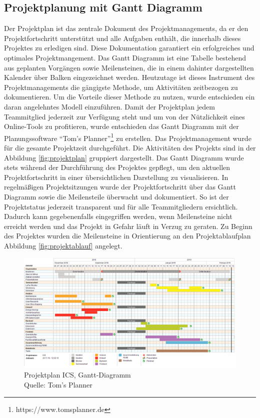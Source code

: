 	\subsection{Projektplanung mit Gantt Diagramm}
	Der Projektplan ist das zentrale Dokument des Projektmanagements, da er den Projektfortschritt unterstützt und alle Aufgaben enthält, die innerhalb dieses Projektes zu erledigen sind. Diese Dokumentation garantiert ein erfolgreiches und optimales Projektmangement. Das Gantt Diagramm ist eine Tabelle bestehend aus geplanten Vorgängen sowie Meilensteinen, die in einem dahinter dargestellten Kalender über Balken eingezeichnet werden\autocite[Vgl.][S. 107]{projektmanagement}. Heutzutage ist dieses Instrument des Projektmanagements die gängigste Methode, um Aktivitäten zeitbezogen zu dokumentieren. Um die Vorteile dieser Methode zu nutzen, wurde entschieden ein daran angelehntes Modell einzuführen. Damit der Projektplan jedem Teammitglied jederzeit zur Verfügung steht und um von der Nützlichkeit eines Online-Tools zu profitieren, wurde entschieden das Gantt Diagramm mit der Planungssoftware \enquote{Tom's Planner}\footnote{https://www.tomsplanner.de} zu erstellen.
	Das Projektmanagement wurde für die gesamte Projektzeit durchgeführt. Die Aktivitäten des Projekts sind in der Abbildung \vref{fig:projektplan} gruppiert dargestellt. Das Gantt Diagramm wurde stets während der Durchführung des Projektes gepflegt, um den aktuellen Projektfortschritt in einer übersichtlichen Darstellung zu visualisieren. In regelmäßigen Projektsitzungen wurde der Projektfortschritt über das Gantt Diagramm sowie die Meilensteile überwacht und dokumentiert. So ist der Projektstatus jederzeit transparent und für alle Teammitgliedern ersichtlich. Dadurch kann gegebenenfalls eingegriffen werden, wenn Meilensteine nicht erreicht werden und das Projekt in Gefahr läuft in Verzug zu geraten.  
	 Zu Beginn des Projektes wurden die Meilensteine in Orientierung an den Projektablaufplan Abbildung \vref{fig:projektablauf} angelegt. 
	\begin{figure}[H]
		\centering 
		\includegraphics[width=14cm]{img/projektplan.png}
		\captionsetup{format=hang}
		\caption[Projektplan]{\label{fig:projektplan} Projektplan ICS, Gantt-Diagramm \\ Quelle: Tom's Planner}
	\end{figure}
